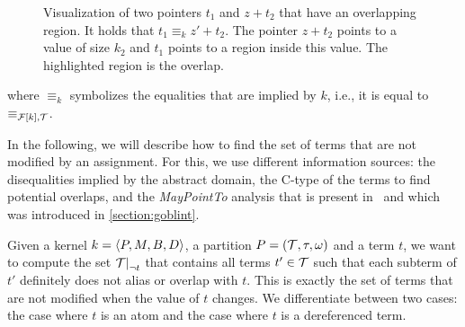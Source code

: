 \begin{figure}
	\centering

	\caption[Visualization of two pointers $t_1$ and $z+ t_2$ that have an overlapping region.]{Visualization of two pointers $t_1$ and $z+ t_2$ that have an overlapping region.
	It holds that $t_1 \equiv_{k} z' + t_2$.
	The pointer $z+ t_2$ points to a value of size $k_2$ and
	$t_1$ points to a region inside this value.
	The highlighted region is the overlap.}\label{fig:overlap1}
	\end{figure}


where $\equiv_{k}$ symbolizes the equalities that are implied by $k$, i.e.,
it is equal to $\equiv_{\mathcal{F}[k],\mathcal{T}}$.

In the following, we will describe how to find the set of terms
that are not modified by an assignment.
For this, we use different information sources: the disequalities implied by the abstract domain, the C-type of the terms to find potential overlaps, and the \emph{MayPointTo} analysis that is present in \goblint\ and which was introduced in \cref{section:goblint}.

Given a kernel $k = \langle P, M, B, D\rangle$, a partition $P = (\mathcal{T}, \tau, \omega)$ and a term $t$,
we want to compute the set $\restr{\T}{\neg t}$ that contains all terms $t' \in \mathcal{T}$ such that each subterm of $t'$ definitely does not alias or overlap with $t$.
This is exactly the set of terms that are not modified when the value of $t$ changes.
We differentiate between two cases: the case where $t$ is an atom and the case where $t$ is a dereferenced term.

